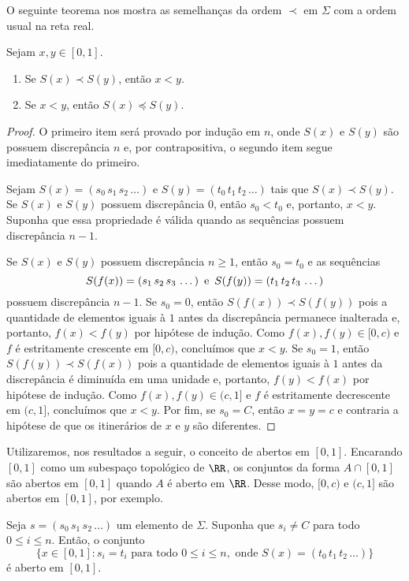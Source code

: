 O seguinte teorema nos mostra as semelhanças da ordem $\prec$ em $\Sigma$ com a ordem usual na reta real.

\begin{theorem}
\label{teo1}
Sejam $x, y \in [0, 1]$.
\begin{enumerate}
\item Se $S(x) \prec S(y)$, então $x < y$.
\item Se $x < y$, então $S(x) \preceq S(y)$.
\end{enumerate}
\end{theorem}

\begin{proof}
O primeiro item será provado por indução em $n$, onde $S(x)$ e $S(y)$ são possuem discrepância $n$ e, por contrapositiva, o segundo item segue imediatamente do primeiro.

Sejam $S(x) = (s_0\, s_1\, s_2\, \dots)$ e $S(y) = (t_0\, t_1\, t_2\, \dots)$ tais que $S(x) \prec S(y)$. Se $S(x)$ e $S(y)$ possuem discrepância $0$, então $s_0 < t_0$ e, portanto, $x < y$. Suponha que essa propriedade é válida quando as sequências possuem discrepância $n-1$.

Se $S(x)$ e $S(y)$ possuem discrepância $n \geq 1$, então $s_0 = t_0$ e as sequências 
$$S(f(x)) = (s_1\, s_2\, s_3\, \dots) \textrm{\, e \,} S(f(y)) = (t_1\, t_2\, t_3\, \dots)$$
possuem discrepância $n-1$. Se $s_0 = 0$, então $S(f(x)) \prec S(f(y))$ pois a quantidade de elementos iguais à $1$ antes da discrepância permanece inalterada e, portanto, $f(x) < f(y)$ por hipótese de indução. Como $f(x), f(y) \in [0, c)$ e $f$ é estritamente crescente em $[0, c)$, concluímos que $x < y$. Se $s_0 = 1$, então $S(f(y)) \prec S(f(x))$ pois a quantidade de elementos iguais à $1$ antes da discrepância é diminuída em uma unidade e, portanto, $f(y) < f(x)$ por hipótese de indução. Como $f(x), f(y) \in (c, 1]$ e $f$ é estritamente decrescente em $(c, 1]$, concluímos que $x < y$. Por fim, se $s_0 = C$, então $x = y = c$ e contraria a hipótese de que os itinerários de $x$ e $y$ são diferentes.
\end{proof}

Utilizaremos, nos resultados a seguir, o conceito de abertos em $[0, 1]$. Encarando $[0, 1]$ como um subespaço topológico de $\RR$, os conjuntos da forma $A \cap [0, 1]$ são abertos em $[0, 1]$ quando $A$ é aberto em $\RR$. Desse modo, $[0, c)$ e $(c, 1]$ são abertos em $[0, 1]$, por exemplo.

\begin{lemma}
Seja $s = (s_0\, s_1\, s_2\, \dots)$ um elemento de $\Sigma$. Suponha que $s_i \neq C$ para todo $0 \leq i \leq n$. Então, o conjunto
$$\{ x \in [0, 1] : s_i = t_i \textrm{ para todo } 0 \leq i \leq n, \text{ onde } S(x) = (t_0\, t_1\, t_2\, \dots) \}$$
é aberto em $[0, 1]$.
\end{lemma}

